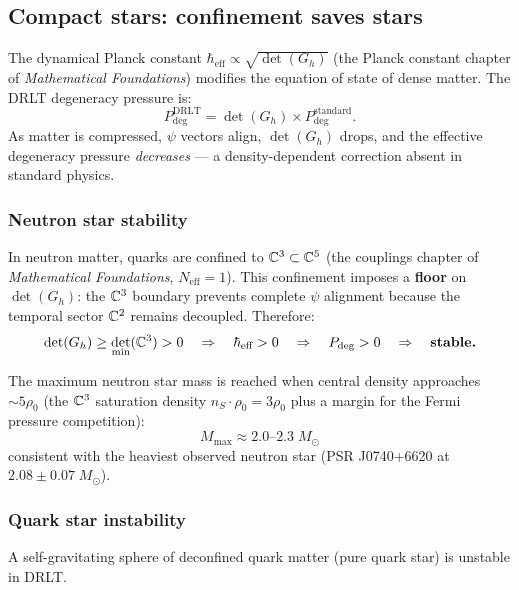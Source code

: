 \subsection{Compact stars: confinement saves stars}

The dynamical Planck constant $\hbar_\text{eff} \propto \sqrt{\det(G_h)}$ (the Planck constant chapter of \textit{Mathematical Foundations}) modifies the equation of state of dense matter. The DRLT degeneracy pressure is:
\begin{equation}
P_\text{deg}^\text{DRLT} = \det(G_h) \times P_\text{deg}^\text{standard}.
\end{equation}
As matter is compressed, $\psi$ vectors align, $\det(G_h)$ drops, and the effective degeneracy pressure \emph{decreases} --- a density-dependent correction absent in standard physics.

\subsubsection{Neutron star stability}

In neutron matter, quarks are confined to $\mathbb{C}^3 \subset \mathbb{C}^5$ (the couplings chapter of \textit{Mathematical Foundations}, $N_\text{eff} = 1$). This confinement imposes a \textbf{floor} on $\det(G_h)$: the $\mathbb{C}^3$ boundary prevents complete $\psi$ alignment because the temporal sector $\mathbb{C}^2$ remains decoupled. Therefore:
\begin{equation}
\det(G_h) \geq \det_\text{min}(\mathbb{C}^3) > 0 \quad\Rightarrow\quad \hbar_\text{eff} > 0 \quad\Rightarrow\quad P_\text{deg} > 0 \quad\Rightarrow\quad \textbf{stable.}
\end{equation}

The maximum neutron star mass is reached when central density approaches $\sim 5\rho_0$ (the $\mathbb{C}^3$ saturation density $n_S \cdot \rho_0 = 3\rho_0$ plus a margin for the Fermi pressure competition):
\begin{equation}
M_\text{max} \approx 2.0\text{--}2.3\;M_\odot
\end{equation}
consistent with the heaviest observed neutron star (PSR J0740+6620 at $2.08 \pm 0.07\;M_\odot$).

\subsubsection{Quark star instability}

\begin{theorem}
A self-gravitating sphere of deconfined quark matter (pure quark star) is unstable in DRLT.
\end{theorem}

